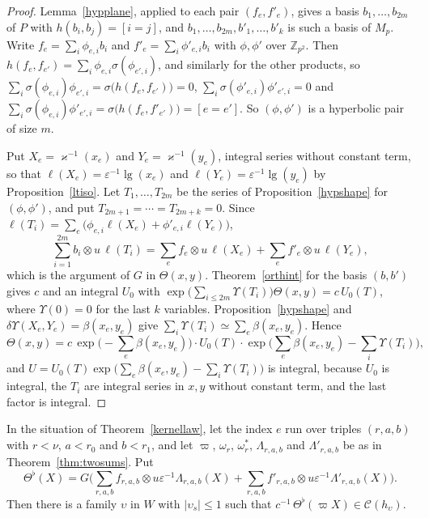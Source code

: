 \begin{proof}
Lemma~\ref{hypplane}, applied to each pair $(f_e,f'_e)$, gives a basis $b_1,\dots,b_{2m}$ of $P$ with $h(b_i,b_j)=[i=j]$, and $b_1,\dots,b_{2m},b'_1,\dots,b'_k$ is such a basis of $M_p$. Write $f_e=\sum_i\phi_{e,i}b_i$ and $f'_e=\sum_i\phi'_{e,i}b_i$ with $\phi,\phi'$ over $\mathbb Z_{p^2}$. Then $h(f_e,f_{e'})=\sum_i\phi_{e,i}\sigma(\phi_{e',i})$, and similarly for the other products, so $\sum_i\sigma(\phi_{e,i})\phi_{e',i}=\sigma\big(h(f_e,f_{e'})\big)=0$, $\sum_i\sigma(\phi'_{e,i})\phi'_{e',i}=0$ and $\sum_i\sigma(\phi_{e,i})\phi'_{e',i}=\sigma\big(h(f_e,f'_{e'})\big)=[e=e']$. So $(\phi,\phi')$ is a hyperbolic pair of size $m$.

Put $X_e=\varkappa^{-1}(x_e)$ and $Y_e=\varkappa^{-1}(y_e)$, integral series without constant term, so that $\ell(X_e)=\varepsilon^{-1}\operatorname{lg}(x_e)$ and $\ell(Y_e)=\varepsilon^{-1}\operatorname{lg}(y_e)$ by Proposition~\ref{ltiso}. Let $T_1,\dots,T_{2m}$ be the series of Proposition~\ref{hypshape} for $(\phi,\phi')$, and put $T_{2m+1}=\cdots=T_{2m+k}=0$. Since $\ell(T_i)=\sum_e\big(\phi_{e,i}\ell(X_e)+\phi'_{e,i}\ell(Y_e)\big)$,
\[
\sum_{i=1}^{2m}b_i\otimes u\,\ell(T_i)=\sum_ef_e\otimes u\,\ell(X_e)+\sum_ef'_e\otimes u\,\ell(Y_e),
\]
which is the argument of $G$ in $\Theta(x,y)$. Theorem~\ref{orthint} for the basis $(b,b')$ gives $c$ and an integral $U_0$ with $\exp\big(\sum_{i\le2m}\Upsilon(T_i)\big)\Theta(x,y)=c\,U_0(T)$, where $\Upsilon(0)=0$ for the last $k$ variables. Proposition~\ref{hypshape} and $\delta\Upsilon(X_e,Y_e)=\beta(x_e,y_e)$ give $\sum_i\Upsilon(T_i)\simeq\sum_e\beta(x_e,y_e)$. Hence
\[
\Theta(x,y)=c\,\exp\Big(-\sum_e\beta(x_e,y_e)\Big)\cdot U_0(T)\cdot\exp\Big(\sum_e\beta(x_e,y_e)-\sum_i\Upsilon(T_i)\Big),
\]
and $U=U_0(T)\exp\big(\sum_e\beta(x_e,y_e)-\sum_i\Upsilon(T_i)\big)$ is integral, because $U_0$ is integral, the $T_i$ are integral series in $x,y$ without constant term, and the last factor is integral.
\end{proof}

\begin{corollary}\label{kernelclass}
In the situation of Theorem~\ref{kernellaw}, let the index $e$ run over triples $(r,a,b)$ with $r<\nu$, $a<r_0$ and $b<r_1$, and let $\varpi$, $\omega_r$, $\omega_r^\ast$, $\Lambda_{r,a,b}$ and $\Lambda'_{r,a,b}$ be as in Theorem~\ref{thm:twosums}. Put
\[
\Theta^\flat(X)=G\Big(\sum_{r,a,b}f_{r,a,b}\otimes u\varepsilon^{-1}\Lambda_{r,a,b}(X)+\sum_{r,a,b}f'_{r,a,b}\otimes u\varepsilon^{-1}\Lambda'_{r,a,b}(X)\Big).
\]
Then there is a family $\upsilon$ in $W$ with $\lvert\upsilon_s\rvert\le1$ such that $c^{-1}\,\Theta^\flat(\varpi X)\in\mathcal C(h_\upsilon)$.
\end{corollary}

